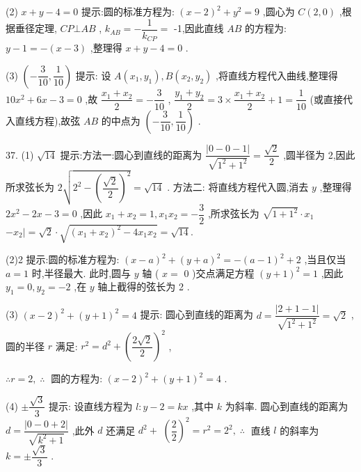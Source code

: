 (2) $x + y - 4 = 0$ 提示:圆的标准方程为: ${\left( x - 2\right) }^{2} + {y}^{2} = 9$ ,圆心为 $C\left( {2,0}\right)$ ,根据垂径定理, ${CP} \bot  {AB}$ , ${k}_{AB} =  - \dfrac{1}{{k}_{CP}} =$ -1,因此直线 ${AB}$ 的方程为: $y - 1 =  - \left( {x - 3}\right)$ ,整理得 $x + y - 4 = 0$ .

(3) $\left( {-\dfrac{3}{10},\dfrac{1}{10}}\right)$ 提示: 设 $A\left( {{x}_{1},{y}_{1}}\right) ,B\left( {{x}_{2},{y}_{2}}\right)$ ,将直线方程代入曲线,整理得 ${10}{x}^{2} + {6x} - 3 = 0$ ,故 $\dfrac{{x}_{1} + {x}_{2}}{2} =  - \dfrac{3}{10}$ , $\dfrac{{y}_{1} + {y}_{2}}{2} = 3 \times  \dfrac{{x}_{1} + {x}_{2}}{2} + 1 = \dfrac{1}{10}$ (或直接代入直线方程),故弦 ${AB}$ 的中点为 $\left( {-\dfrac{3}{10},\dfrac{1}{10}}\right)$ .

37. (1) $\sqrt{14}$ 提示:方法一:圆心到直线的距离为 $\dfrac{\left| 0 - 0 - 1\right| }{\sqrt{{1}^{2} + {1}^{2}}} = \dfrac{\sqrt{2}}{2}$ ,圆半径为 2,因此所求弦长为 $2\sqrt{{2}^{2} - {\left( \dfrac{\sqrt{2}}{2}\right) }^{2}} = \sqrt{14}$ . 方法二: 将直线方程代入圆,消去 $y$ ,整理得 $2{x}^{2} - {2x} - 3 = 0$ ,因此 ${x}_{1} + {x}_{2} = 1,{x}_{1}{x}_{2} =  - \dfrac{3}{2}$ ,所求弦长为 $\sqrt{1 + {1}^{2}} \cdot  {x}_{1}$  $- {x}_{2} \mid   = \sqrt{2} \cdot  \sqrt{{\left( {x}_{1} + {x}_{2}\right) }^{2} - 4{x}_{1}{x}_{2}} = \sqrt{14}.$

(2)2 提示:圆的标准方程为: ${\left( x - a\right) }^{2} + {\left( y + a\right) }^{2} =  - {\left( a - 1\right) }^{2} + 2$ ,当且仅当 $a = 1$ 时,半径最大. 此时,圆与 $y$ 轴 ( $x =$ 0 )交点满足方程 ${\left( y + 1\right) }^{2} = 1$ ,因此 ${y}_{1} = 0,{y}_{2} =  - 2$ ,在 $y$ 轴上截得的弦长为 2 .

(3) ${\left( x - 2\right) }^{2} + {\left( y + 1\right) }^{2} = 4$ 提示: 圆心到直线的距离为 $d = \dfrac{\left| 2 + 1 - 1\right| }{\sqrt{{1}^{2} + {1}^{2}}} = \sqrt{2}$ ,圆的半径 $r$ 满足: ${r}^{2} = {d}^{2} + {\left( \dfrac{2\sqrt{2}}{2}\right) }^{2}$ ,

$\therefore r = 2,\;\therefore \;$ 圆的方程为: ${\left( x - 2\right) }^{2} + {\left( y + 1\right) }^{2} = 4$ .

(4) $\pm  \dfrac{\sqrt{3}}{3}$ 提示: 设直线方程为 $l : y - 2 = {kx}$ ,其中 $k$ 为斜率. 圆心到直线的距离为 $d = \dfrac{\left| 0 - 0 + 2\right| }{\sqrt{{k}^{2} + 1}}$ ,此外 $d$ 还满足 ${d}^{2} +$  ${\left( \dfrac{2}{2}\right) }^{2} = {r}^{2} = {2}^{2},\;\therefore \;$ 直线 $l$ 的斜率为 $k =  \pm  \dfrac{\sqrt{3}}{3}$ .

